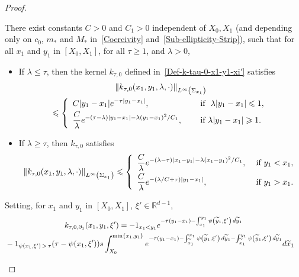 \documentclass[AHL,Unicode,longabstracts]{cedram}
\newcommand*\R{\mathbb{R}}
\newcommand*\ds{\displaystyle}
\renewcommand{\leq}{\leqslant}
\renewcommand{\geq}{\geqslant}
\renewcommand{\tilde}{\widetilde}
\let\oldtilde\tilde
\renewcommand*{\tilde}[1]{\mathchoice{\widetilde{#1}}{\widetilde{#1}}{\oldtilde{#1}}{\oldtilde{#1}}}
\begin{document}
\begin{proof}
\begin{lemm}\label{Lem-Est-k-0-x1-y1}
There exist constants $C>0$ and $C_1 >0$ independent of $X_0, X_1$ (and depending only on $c_0$, $m_*$ and $M_*$ in~\eqref{Coercivity} and~\eqref{Sub-ellipticity-Strip}), such that for all $x_1$ and $y_1$ in $[X_0, X_1]$, for all $\tau \geq 1$, and $\lambda >0$,
\begin{itemize}
\item If $\lambda \leq \tau$, then the kernel $k_{\tau,0}$ defined in~\eqref{Def-k-tau-0-x1-y1-xi'} satisfies
\begin{multline}\label{Est-k-tau-0-x1-y1-Low-Freq}
\| k_{\tau, 0}(x_1,y_1,\lambda, \cdot) \|_{L^\infty\left(\Sigma_{x_1}\right)}\\
\leq
\left\{
\begin{array}{ll}
\ds C | y_1- x_1 | e^{-\tau | y_1- x_1 | }, \quad & \text{ if } \ \lambda |y_1 -x_1| \leqslant 1,
\smallskip
\\
\ds \frac{C}{\lambda }e^{- (\tau - \lambda) |y_1- x_1| - \lambda (y_1- x_1) ^ 2/C_1}, \quad & \text{ if } \lambda |y_1 -x_1| \geqslant 1.
\end{array}
\right.
\end{multline}
\item If $\lambda \geq \tau$, then $k_{\tau,0}$ satisfies
\begin{equation}\label{Est-k-tau-0-x1-y1-High-Freq}
\| k_{\tau, 0}(x_1,y_1,\lambda, \cdot) \|_{L^\infty\left(\Sigma_{x_1}\right)}
\leq
\left\{
\begin{array}{ll}
\ds \frac{C}{\lambda} e^{-(\lambda-\tau) |x_1-y_1|- \lambda (x_1-y_1)^2/C_1}, & \text{ if } y_1<x_1,
\smallskip
\\
\ds \frac{C}{\lambda} e^{-(\lambda/C + \tau)|y_1 - x_1|}, & \text{ if } y_1>x_1.
\end{array}
\right.
\end{equation}
\end{itemize}
Setting, for $x_1$ and $y_1$ in $[X_0, X_1]$, $\xi' \in \R^{d-1}$,
\begin{multline}\label{Def-k-tau-0-d1}
k_{\tau,0,\partial_1} (x_1, y_1, \xi') = -1_{x_1 < y_1} e^{-\tau(y_1-x_1) - \int_{x_1}^{y_1} \psi\left(\tilde y_1, \xi'\right) \, d\tilde y_1}
\\
\begin{aligned}
& - 1_{\psi(x_1, \xi')\,>\,\tau} (\tau - \psi(x_1, \xi'))s
\int_{X_0}^{\min\{x_1,y_1\}} e^{-\tau(y_1-x_1) - \int_{\tilde x_1}^{x_1} \psi\left(\tilde y_1, \xi'\right) \, d\tilde y_1 - \int_{\tilde x_1}^{y_1} \psi\left(\tilde y_1, \xi'\right) \, d\tilde y_1} d\tilde x_1

\end{aligned}
\end{multline}
\end{lemm}
\end{proof}
\end{document}
